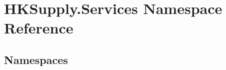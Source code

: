 \hypertarget{namespace_h_k_supply_1_1_services}{}\section{H\+K\+Supply.\+Services Namespace Reference}
\label{namespace_h_k_supply_1_1_services}
\subsection*{Namespaces}
\begin{DoxyCompactItemize}
\end{DoxyCompactItemize}

